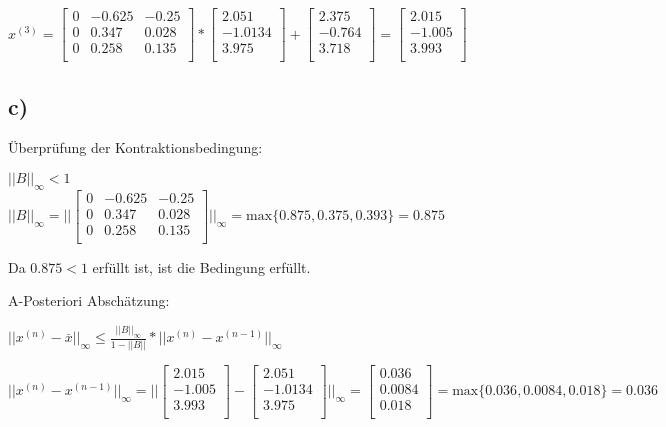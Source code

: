 \documentclass{article}
\begin{document}
\(
x^{(3)} = 
\begin{bmatrix} 
0 & -0.625 & -0.25 \\
0 & 0.347 & 0.028 \\
0 & 0.258 & 0.135 \\
\end{bmatrix}
*
\begin{bmatrix} 
2.051\\
-1.0134\\
3.975\\
\end{bmatrix}
+
\begin{bmatrix} 
2.375 \\
-0.764 \\
3.718 \\
\end{bmatrix}
=
\begin{bmatrix} 
2.015\\
-1.005\\
3.993\\
\end{bmatrix}
\)

\newpage
\subsection*{c)}

Überprüfung der Kontraktionsbedingung:

\(||B||_\infty < 1\)\\
\(
||B||_\infty 
=
||
\begin{bmatrix} 
0 & -0.625 & -0.25 \\
0 & 0.347 & 0.028 \\
0 & 0.258 & 0.135 \\
\end{bmatrix}
||_\infty
=
\text{max}\{0.875,0.375,0.393\}
=
0.875
\)

Da \(0.875 < 1\) erfüllt ist, ist die Bedingung erfüllt.

\vspace{5mm}

A-Posteriori Abschätzung:

\(||x^{(n)} - \overset{\_}{x}||_\infty \leq \frac{||B||_\infty}{1 - ||B||} * ||x^{(n)} - x^{(n-1)}||_\infty\)

\(
||x^{(n)} - x^{(n-1)}||_\infty
=
||
\begin{bmatrix} 
2.015\\
-1.005\\
3.993\\
\end{bmatrix}
-
\begin{bmatrix} 
2.051\\
-1.0134\\
3.975\\
\end{bmatrix}
||_\infty
=
\begin{bmatrix} 
0.036\\
0.0084\\
0.018\\
\end{bmatrix}
=
\text{max}\{0.036,0.0084,0.018\}
=
0.036
\)
\end{document}
